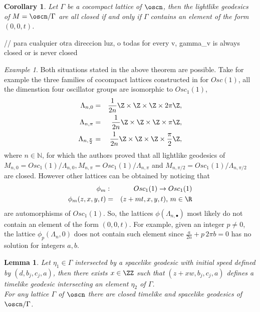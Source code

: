 \documentclass[11pt]{amsart}
\theoremstyle{plain}
\newtheorem{cor}[thm]{Corollary}
\newtheorem{lem}[thm]{Lemma}
\theoremstyle{definition}
\theoremstyle{remark}
\newtheorem{exa}[thm]{Example}
\begin{document}
\begin{cor}
	Let $\Gamma$ be a cocompact lattice of $\oscn$, then the lightlike geodesics of $M=\oscn/\Gamma$ are all closed if and only if $\Gamma$ contains an element of the form $(0,0,t)$.
\end{cor}

// para cualquier otra direccion luz, o todas for every v, gamma_v is always closed or is never closed

\begin{exa} Both situations stated in the above theorem are possible. Take for example the three families of cocompact lattices constructed in \cite{OV} for $Osc(1)$, all the dimenstion four oscillator groups are isomorphic to $Osc_1(1)$,
	\begin{eqnarray*} \label{geodlight}
		\Lambda_{n,0}&=&\frac{1}{2n}\Z \times \Z \times \Z \times 2 \pi \Z,\\
		\Lambda_{n,\pi}&=&\frac{1}{2n}\Z \times \Z \times \Z \times \pi \Z,\\
		\Lambda_{n,\frac{\pi}{2}}&=&\frac{1}{2n}\Z \times \Z \times \Z \times \frac{\pi}{2} \Z,
	\end{eqnarray*}
	where $n \in \mathbb{N}$, for which the authors proved that all lightlike geodesics of $M_{n,0}=Osc_1(1)/\Lambda_{n,0}, M_{n,\pi}=Osc_1(1)/\Lambda_{n,\pi}$ and $M_{n,\pi/2}=Osc_1(1)/\Lambda_{n,\pi/2}$ are closed. However other  lattices can be obtained by noticing that
	\begin{eqnarray*}
		\phi_m &:& Osc_1(1) \rightarrow Osc_1(1)\\
		\phi_m(z,x,y,t)&=&(z+mt,x,y,t) \textrm{,    $m \in \R$}
	\end{eqnarray*}
	are  automorphisms of $Osc_1(1)$. So, the  lattices $\phi(\Lambda_{n,\bullet})$ most likely do not contain an element of the form $(0,0, t)$. For example, given an integer $p \neq 0$, the lattice $\phi_p(\Lambda_n,0)$ does not contain such element since $\frac{a}{2 n}+ p \, 2 \pi b = 0$ has no solution for integers $a,b$. 
\end{exa}

\begin{lem}
    Let $\eta_1 \in \Gamma$ intersected by a spacelike geodesic with initial speed defined by $(d,b_j,c_j,a)$, then there exists $x \in \ZZ$ such that $(z + x w, b_j,c_j,a)$ defines a timelike geodesic intersecting an element $\eta_2$ of $\Gamma$. \\

	For any lattice $\Gamma$ of $\oscn$ there are closed timelike and spacelike geodesics of $\oscn/ \Gamma$.
\end{lem}
\end{document}
